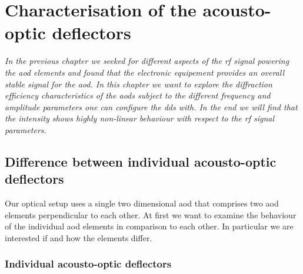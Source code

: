 \chapter{Characterisation of the acousto-optic deflectors}\label{ch:acousto_optic_deflectors}

\textit{In the previous chapter we seeked for different aspects of the
\gls{rf} signal powering the \gls{aod} elements and found that the
electronic equipement provides an overall stable signal for the \gls{aod}.
In this chapter we want to explore the diffraction efficiency characteristics
of the \gls{aod}s subject to the different frequency and amplitude parameters
one can configure the \gls{dds} with. In the end we will find that the
intensity shows highly non-linear behaviour with respect to the \gls{rf}
signal parameters.}

\section{Difference between individual acousto-optic deflectors}

Our optical setup uses a single two dimensional \gls{aod} that comprises two
\gls{aod} elements perpendicular to each other. At first we want to examine the
behaviour of the individual \gls{aod} elements in comparison to each other. In
particular we are interested if and how the elements differ.

\subsection{Individual acousto-optic deflectors}

